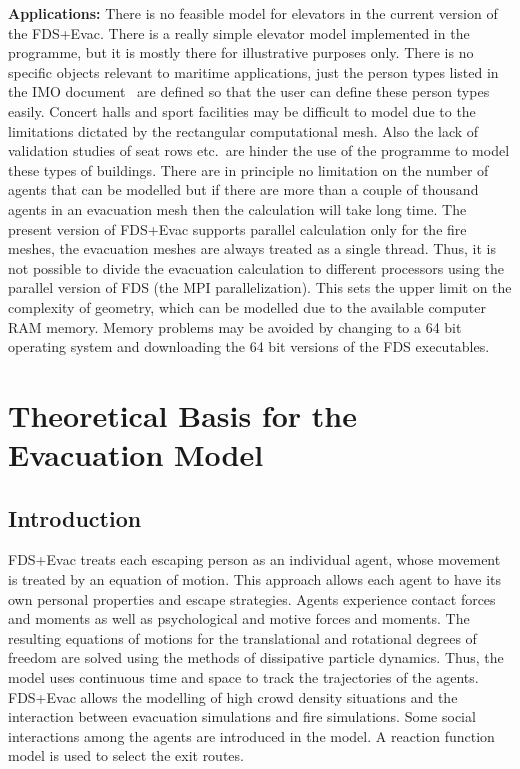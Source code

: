 \documentclass[12pt,a4paper,final,twoside]{stylevk}
\begin{document}
\textbf{Applications:} There is no feasible model for elevators in the
current version of the FDS+Evac.  There is a really simple elevator
model implemented in the programme, but it is mostly there for
illustrative purposes only.  There is no specific objects relevant to
maritime applications, just the person types listed in the IMO
document~\cite{IMO07} are defined so that the user can define these
person types easily.  Concert halls and sport facilities may be
difficult to model due to the limitations dictated by the rectangular
computational mesh.  Also the lack of validation studies of seat rows
etc.\ are hinder the use of the programme to model these types of
buildings.  There are in principle no limitation on the number of
agents that can be modelled but if there are more than a couple of
thousand agents in an evacuation mesh then the calculation will take
long time.  The present version of FDS+Evac supports parallel
calculation only for the fire meshes, the evacuation meshes are always
treated as a single thread.  Thus, it is not possible to divide the
evacuation calculation to different processors using the parallel
version of FDS (the MPI parallelization).  This sets the upper limit
on the complexity of geometry, which can be modelled due to the
available computer RAM memory.  Memory problems may be avoided by
changing to a 64 bit operating system and downloading the 64 bit
versions of the FDS executables.

\clearpage

\newpage


\chapter{Theoretical Basis for the Evacuation
  Model}\label{Sec_BasisModel} 


\section{Introduction}

\noindent FDS+Evac treats each escaping person as an individual agent,
whose movement is treated by an equation of motion.  This approach
allows each agent to have its own personal properties and escape
strategies.  Agents experience contact forces and moments as well as
psychological and motive forces and moments.  The resulting equations
of motions for the translational and rotational degrees of freedom are
solved using the methods of dissipative particle dynamics.  Thus, the
model uses continuous time and space to track the trajectories of the
agents.  FDS+Evac allows the modelling of high crowd density
situations and the interaction between evacuation simulations and fire
simulations.  Some social interactions among the agents are introduced
in the model.  A reaction function model is used to select the exit
routes.
\end{document}
